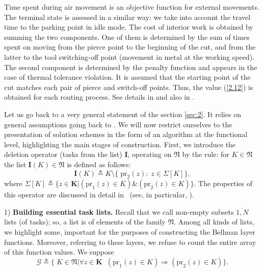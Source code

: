 Time spent during air movement
is an
objective function for external movements.
The terminal state is assessed in a similar way:
we take into account the travel time to the parking point
in idle mode.
The cost of interior work
is obtained by summing the two components.
One of them is determined by the sum of times
spent on moving
from the pierce point to the beginning of the cut,
and from the latter to the tool switching-off point
(movement in metal at the working speed).
The second component is determined by the penalty function and
appears in the case of thermal tolerance violation.
It is assumed that the starting point of the cut
matches each pair
of pierce and switch-off points.
Thus,
the value (\ref{2.12})
is obtained
for each routing process.
See details in
\cite[part 1, chapter 3]{4}
and also in
\cite{18}.

\label{sec:4}

Let us go back to a very general statement of the section
\ref{sec:2}.
It relies on general assumptions going back to
\cite[$\S$4.9]{14}.
We will now restrict ourselves to the presentation of
solution schemes
in the form of an algorithm at the functional level,
highlighting the main stages of construction.
First,
we introduce the deletion operator
(tasks from the list)
$\mathbf{I}$,
operating on $\mathfrak{N}$
by the rule:
for
$K \in \mathfrak{N}$
the list
$\mathbf{I}(K) \in \mathfrak{N}$
is defined as follows:
\begin{equation}\label{4.1}
  \mathbf{I}(K) {\triangleq} K \setminus \{\;\mathrm{pr}_2(z):\;z \in \Sigma[K]\},
\end{equation}
where
$\Sigma[K] {\triangleq} \{z \in \mathbf{K} \vert (\mathrm{pr}_1(z) \in K) \& (\mathrm{pr}_2(z) \in K)\}.$
The properties of this operator are discussed in detail in~\cite[part 2]{14}
(see, in particular, \cite[$\S 2.2$]{14}).

1) {\bf Building essential task lists.}
Recall
that we call
non-empty subsets
$ \overline {1, N} $
lists
(of tasks);
so,
a list is of elements of the family
$\mathfrak{N}$.
Among all kinds of lists,
we highlight some,
important for the purposes of constructing the Bellman layer functions.
Moreover,
referring to these layers,
we refuse to count the entire array of
this function values.
We suppose
\begin{equation}\label{4.2}
  \mathcal{G} {\triangleq} \{\;K \in \mathfrak{N} \vert
  \forall{z} \in \mathbf{K}\;\;(\mathrm{pr}_1(z) \in K) \Longrightarrow (\mathrm{pr}_2(z) \in K)\}.
\end{equation}

